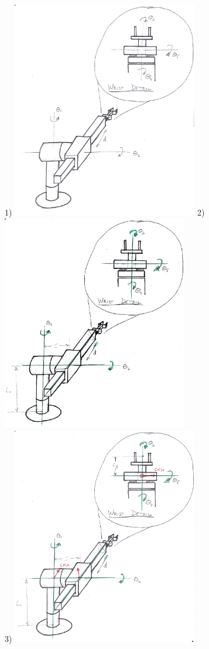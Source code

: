 \begin{Example}
1) \includegraphics[width=3.2in]{figs03/00416.eps}
2) \includegraphics[width=3.2in]{figs03/00417.eps}\\
3) \includegraphics[width=3.2in]{figs03/00418.eps}

\end{Example}
